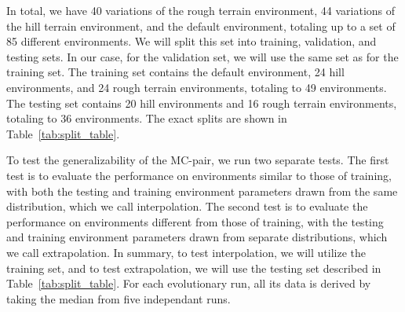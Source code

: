         In total, we have 40 variations of the rough terrain environment, 44 variations of the hill terrain environment, and the default environment, totaling up to a set of 85 different environments. We will split this set into training, validation, and testing sets. In our case, for the validation set, we will use the same set as for the training set. The training set contains the default environment, 24 hill environments, and 24 rough terrain environments, totaling to 49 environments. The testing set contains 20 hill environments and 16 rough terrain environments, totaling to 36 environments. The exact splits are shown in Table~\ref{tab:split_table}.

        To test the generalizability of the MC-pair, we run two separate tests. The first test is to evaluate the performance on environments similar to those of training, with both the testing and training environment parameters drawn from the same distribution, which we call interpolation. The second test is to evaluate the performance on environments different from those of training, with the testing and training environment parameters drawn from separate distributions, which we call extrapolation. In summary, to test interpolation, we will utilize the training set, and to test extrapolation, we will use the testing set described in Table~\ref{tab:split_table}. For each evolutionary run, all its data is derived by taking the median from five independant runs. 
